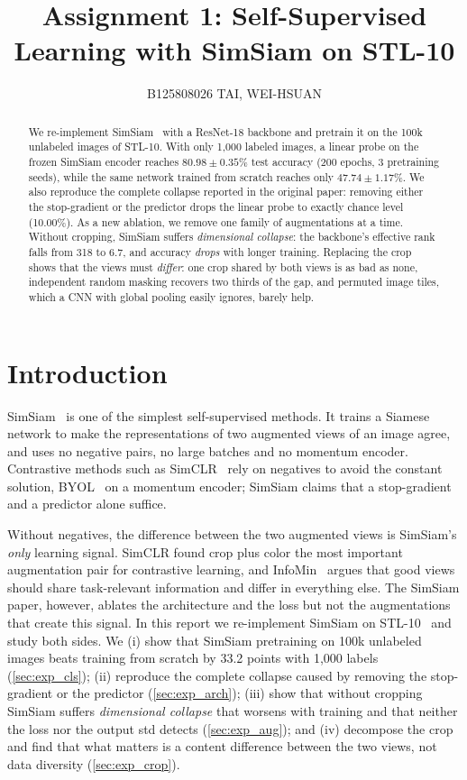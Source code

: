\documentclass[10pt,twocolumn,letterpaper]{article}
\title{Assignment 1: Self-Supervised Learning with SimSiam on STL-10}
\author{B125808026 TAI, WEI-HSUAN}
\begin{document}
\maketitle

\begin{abstract}
We re-implement SimSiam~\cite{chen2021simsiam} with a ResNet-18 backbone and pretrain it on the 100k unlabeled images of STL-10.
With only 1,000 labeled images, a linear probe on the frozen SimSiam encoder reaches $80.98\pm0.35\%$ test accuracy (200 epochs, 3 pretraining seeds), while the same network trained from scratch reaches only $47.74\pm1.17\%$.
We also reproduce the complete collapse reported in the original paper: removing either the stop-gradient or the predictor drops the linear probe to exactly chance level (10.00\%).
As a new ablation, we remove one family of augmentations at a time. Without cropping, SimSiam suffers \emph{dimensional collapse}: the backbone's effective rank falls from 318 to 6.7, and accuracy \emph{drops} with longer training.
Replacing the crop shows that the views must \emph{differ}: one crop shared by both views is as bad as none, independent random masking recovers two thirds of the gap, and permuted image tiles, which a CNN with global pooling easily ignores, barely help.
\end{abstract}

\section{Introduction}
\label{sec:intro}

SimSiam~\cite{chen2021simsiam} is one of the simplest self-supervised methods. It trains a Siamese network to make the representations of two augmented views of an image agree, and uses no negative pairs, no large batches and no momentum encoder.
Contrastive methods such as SimCLR~\cite{chen2020simclr} rely on negatives to avoid the constant solution, BYOL~\cite{grill2020byol} on a momentum encoder; SimSiam claims that a stop-gradient and a predictor alone suffice.

Without negatives, the difference between the two augmented views is SimSiam's \emph{only} learning signal.
SimCLR found crop plus color the most important augmentation pair for contrastive learning, and InfoMin~\cite{tian2020infomin} argues that good views should share task-relevant information and differ in everything else.
The SimSiam paper, however, ablates the architecture and the loss but not the augmentations that create this signal.
In this report we re-implement SimSiam on STL-10~\cite{coates2011stl10} and study both sides.
We (i) show that SimSiam pretraining on 100k unlabeled images beats training from scratch by 33.2 points with 1,000 labels (\cref{sec:exp_cls});
(ii) reproduce the complete collapse caused by removing the stop-gradient or the predictor (\cref{sec:exp_arch});
(iii) show that without cropping SimSiam suffers \emph{dimensional collapse} that worsens with training and that neither the loss nor the output std detects (\cref{sec:exp_aug}); and
(iv) decompose the crop and find that what matters is a content difference between the two views, not data diversity (\cref{sec:exp_crop}).
\end{document}
